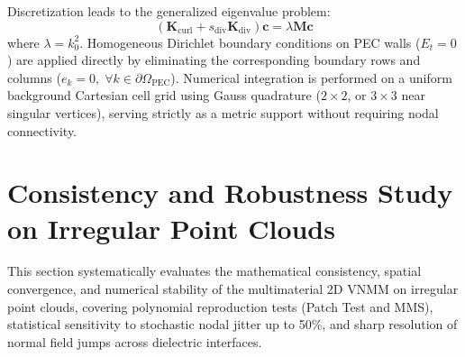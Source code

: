 \documentclass[11pt,a4paper]{article}
\begin{document}
Discretization leads to the generalized eigenvalue problem:
\begin{equation}
(\mathbf{K}_{\mathrm{curl}} + s_{\mathrm{div}} \mathbf{K}_{\mathrm{div}}) \mathbf{c} = \lambda \mathbf{M} \mathbf{c}
\end{equation}
where $\lambda = k_0^2$. Homogeneous Dirichlet boundary conditions on PEC walls ($E_t = 0$) are applied directly by eliminating the corresponding boundary rows and columns ($e_k = 0, \; \forall k \in \partial\Omega_{\mathrm{PEC}}$). Numerical integration is performed on a uniform background Cartesian cell grid using Gauss quadrature ($2 \times 2$, or $3 \times 3$ near singular vertices), serving strictly as a metric support without requiring nodal connectivity.

\section{Consistency and Robustness Study on Irregular Point Clouds}

This section systematically evaluates the mathematical consistency, spatial convergence, and numerical stability of the multimaterial 2D VNMM on irregular point clouds, covering polynomial reproduction tests (Patch Test and MMS), statistical sensitivity to stochastic nodal jitter up to 50\%, and sharp resolution of normal field jumps across dielectric interfaces.
\end{document}
